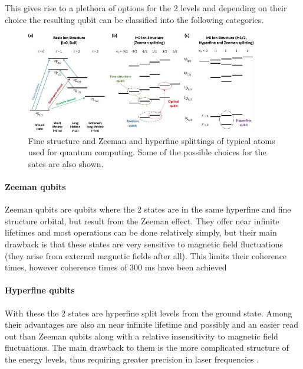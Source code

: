 This gives rise to a plethora of options for the 2 levels and depending on their choice the resulting qubit can be classified into the following categories.


\begin{figure}[h]
    \centering
    \includegraphics[width=0.9\textwidth]{images/TIQC_levels.jpeg}
    \caption{Fine structure and Zeeman and hyperfine splittings of typical atoms used for quantum computing. Some of the possible choices for the sates are also shown.}\label{fig:TIQC_levels}
\end{figure}

\paragraph{Zeeman qubits}
Zeeman qubits are qubits where the 2 states are in the same hyperfine and fine structure orbital, but result from the Zeeman effect.
They offer near infinite lifetimes and most operations can be done relatively simply, but their main drawback is that these states are very sensitive to magnetic field fluctuations (they arise from external magnetic fields after all).
This limits their coherence times, however coherence times of 300 ms have been achieved \cite{rusterLonglivedZeemanTrappedion2016}

\paragraph{Hyperfine qubits}
With these the 2 states are hyperfine split levels from the ground state.
Among their advantages are also an near infinite lifetime and possibly and an easier read out than Zeeman qubits along with a relative insensitivity to magnetic field fluctuations.
The main drawback to them is the more complicated structure of the energy levels, thus requiring greater precision in laser frequencies \cite{bruzewiczTrappedionQuantumComputing2019}.

